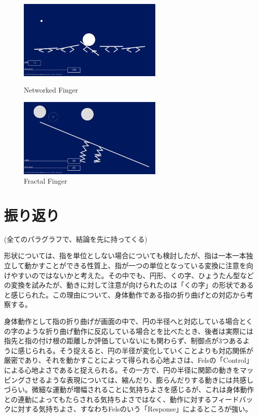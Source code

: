 \begin{figure}[htbp]
  \begin{minipage}[b]{0.5\linewidth}
    \centering
    \includegraphics[keepaspectratio, width=7cm]{img/ball_0.png}
    \caption{Networked Finger}
    \label{fig:ball_0}
  \end{minipage}
  \begin{minipage}[b]{0.5\linewidth}
    \centering
    \includegraphics[keepaspectratio, width=7cm]{img/ball_1.png}
    \caption{Fractal Finger}
    \label{fig:ball_1}
  \end{minipage}
\end{figure}

\section{振り返り}
(全てのパラグラフで、結論を先に持ってくる)

形状については、指を単位としない場合についても検討したが、指は一本一本独立して動かすことができる性質上、指が一つの単位となっている変換に注意を向けやすいのではないかと考えた。その中でも、円形、くの字、ひょうたん型などの変換を試みたが、動きに対して注意が向けられたのは「くの字」の形状であると感じられた。この理由について、身体動作である指の折り曲げとの対応から考察する。

身体動作として指の折り曲げが画面の中で、円の半径へと対応している場合とくの字のような折り曲げ動作に反応している場合とを比べたとき、後者は実際には指先と指の付け根の距離しか評価していないにも関わらず、制御点が3つあるように感じられる。そう捉えると、円の半径が変化していくことよりも対応関係が厳密であり、それを動かすことによって得られる心地よさは、Felsの「Control」による心地よさであると捉えられる。その一方で、円の半径に関節の動きをマッピングさせるような表現については、縮んだり、膨らんだりする動きには共感しづらい。微細な運動が増幅されることに気持ちよさを感じるが、これは身体動作との連動によってもたらされる気持ちよさではなく、動作に対するフィードバックに対する気持ちよさ、すなわちFelsのいう「Response」によるところが強い。

